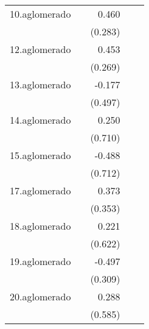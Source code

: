 {\begin{longtable}{l*{4}{D{.}{.}{-1}}}
\addlinespace
10.aglomerado&                     &       0.460         &                     &                     \\
            &                     &     (0.283)         &                     &                     \\
\addlinespace
12.aglomerado&                     &       0.453         &                     &                     \\
            &                     &     (0.269)         &                     &                     \\
\addlinespace
13.aglomerado&                     &      -0.177         &                     &                     \\
            &                     &     (0.497)         &                     &                     \\
\addlinespace
14.aglomerado&                     &       0.250         &                     &                     \\
            &                     &     (0.710)         &                     &                     \\
\addlinespace
15.aglomerado&                     &      -0.488         &                     &                     \\
            &                     &     (0.712)         &                     &                     \\
\addlinespace
17.aglomerado&                     &       0.373         &                     &                     \\
            &                     &     (0.353)         &                     &                     \\
\addlinespace
18.aglomerado&                     &       0.221         &                     &                     \\
            &                     &     (0.622)         &                     &                     \\
\addlinespace
19.aglomerado&                     &      -0.497         &                     &                     \\
            &                     &     (0.309)         &                     &                     \\
\addlinespace
20.aglomerado&                     &       0.288         &                     &                     \\
            &                     &     (0.585)         &                     &                     \\

\end{longtable}}
